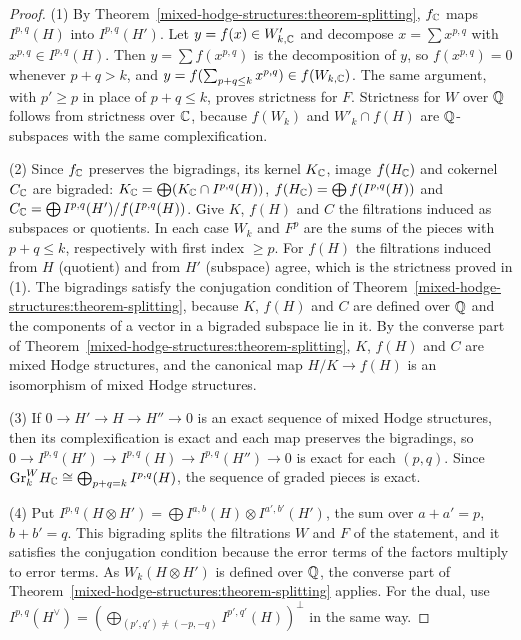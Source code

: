 \begin{proof}
(1) By Theorem~\ref{mixed-hodge-structures:theorem-splitting}, $f_{\mathbb{C}}$ maps $I^{p,q}(H)$ into $I^{p,q}(H')$. Let $y = f(x) \in W'_{k,\mathbb{C}}$ and decompose $x = \sum x^{p,q}$ with $x^{p,q} \in I^{p,q}(H)$. Then
$y = \sum f(x^{p,q})$ is the decomposition of $y$, so $f(x^{p,q}) = 0$ whenever $p + q > k$, and $y = f(\sum_{p+q \leq k}x^{p,q}) \in f(W_{k,\mathbb{C}})$. The same argument, with $p' \geq p$ in place of $p + q \leq k$,
proves strictness for $F$. Strictness for $W$ over $\mathbb{Q}$ follows from strictness over $\mathbb{C}$, because $f(W_k)$ and $W'_k \cap f(H)$ are $\mathbb{Q}$-subspaces with the same complexification.

(2) Since $f_{\mathbb{C}}$ preserves the bigradings, its kernel $K_{\mathbb{C}}$, image $f(H_{\mathbb{C}})$ and cokernel $C_{\mathbb{C}}$ are bigraded: $K_{\mathbb{C}} = \bigoplus(K_{\mathbb{C}} \cap I^{p,q}(H))$, $f(H_{\mathbb{C}}) = \bigoplus f(I^{p,q}(H))$ and
$C_{\mathbb{C}} = \bigoplus I^{p,q}(H')/f(I^{p,q}(H))$. Give $K$, $f(H)$ and $C$ the filtrations induced as subspaces or quotients. In each case $W_k$ and $F^p$ are the sums of the pieces with $p + q \leq k$,
respectively with first index $\geq p$. For $f(H)$ the filtrations induced from $H$ (quotient) and from $H'$ (subspace) agree, which is the strictness proved in (1). The bigradings satisfy the
conjugation condition of Theorem~\ref{mixed-hodge-structures:theorem-splitting}, because $K$, $f(H)$ and $C$ are defined over $\mathbb{Q}$ and the components of a vector in a bigraded subspace lie in it. By the
converse part of Theorem~\ref{mixed-hodge-structures:theorem-splitting}, $K$, $f(H)$ and $C$ are mixed Hodge structures, and the canonical map $H/K \to f(H)$ is an isomorphism of mixed Hodge structures.

(3) If $0 \to H' \to H \to H'' \to 0$ is an exact sequence of mixed Hodge structures, then its complexification is exact and each map preserves the bigradings, so
$0 \to I^{p,q}(H') \to I^{p,q}(H) \to I^{p,q}(H'') \to 0$ is exact for each $(p, q)$. Since $\mathrm{Gr}^W_kH_{\mathbb{C}} \cong \bigoplus_{p+q=k}I^{p,q}(H)$, the sequence of graded pieces is exact.

(4) Put $I^{p,q}(H \otimes H') = \bigoplus I^{a,b}(H) \otimes I^{a',b'}(H')$, the sum over $a + a' = p$, $b + b' = q$. This bigrading splits the filtrations $W$ and $F$ of the statement, and it satisfies the
conjugation condition because the error terms of the factors multiply to error terms. As $W_k(H \otimes H')$ is defined over $\mathbb{Q}$, the converse part of Theorem~\ref{mixed-hodge-structures:theorem-splitting}
applies. For the dual, use $I^{p,q}(H^\vee) = (\bigoplus_{(p',q') \neq (-p,-q)}I^{p',q'}(H))^\perp$ in the same way.
\end{proof}

